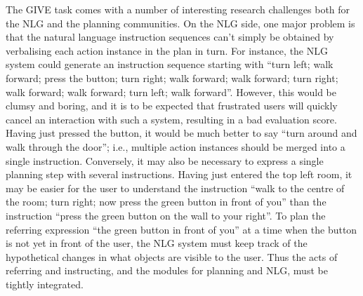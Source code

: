 The GIVE task comes with a number of interesting research challenges
both for the NLG and the planning communities.  On the NLG side, one
major problem is that the natural language instruction sequences can't
simply be obtained by verbalising each action instance in the plan in
turn.  For instance, the NLG system could generate an instruction
sequence starting with ``turn left; walk forward; press the button;
turn right; walk forward; walk forward; turn right; walk forward; walk
forward; turn left; walk forward''.  However, this would be clumsy and
boring, and it is to be expected that frustrated users will quickly
cancel an interaction with such a system, resulting in a bad
evaluation score.  Having just pressed the button, it would be much
better to say ``turn around and walk through the door''; i.e.,
multiple action instances should be merged into a single
instruction. Conversely, it may also be necessary to express a single
planning step with several instructions.  Having just entered the top
left room, it may be easier for the user to understand the instruction
``walk to the centre of the room; turn right; now press the green
button in front of you'' than the instruction ``press the green button
on the wall to your right''.  To plan the referring expression ``the
green button in front of you'' at a time when the button is not yet in
front of the user, the NLG system must keep track of the hypothetical
changes in what objects are visible to the user.  Thus the acts of
referring and instructing, and the modules for planning and NLG, must
be tightly integrated.

